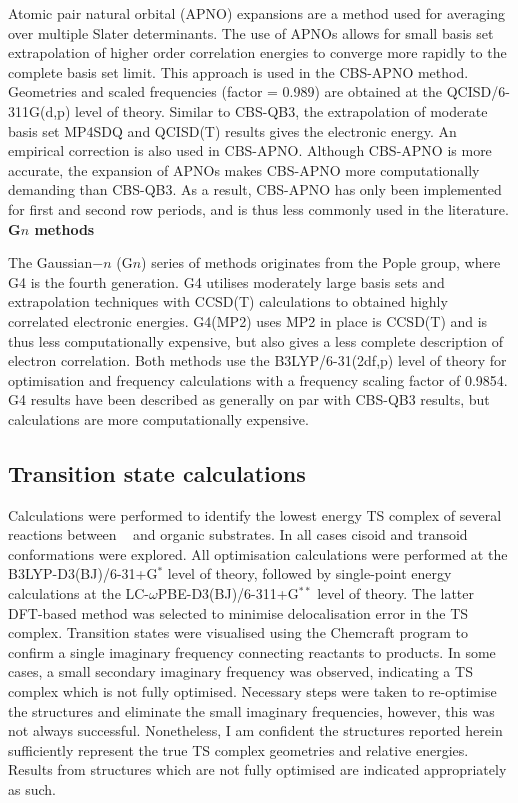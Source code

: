 Atomic pair natural orbital (APNO) expansions are a method used for averaging over multiple Slater determinants. The use of APNOs allows for small basis set extrapolation of higher order correlation energies to converge more rapidly to the complete basis set limit. This approach is used in the CBS-APNO method.\cite{Ochterski1996} Geometries and scaled frequencies (factor = 0.989) are obtained at the QCISD/6-311G(d,p) level of theory. Similar to CBS-QB3, the extrapolation of moderate basis set MP4SDQ and QCISD(T) results gives the electronic energy. An empirical correction is also used in CBS-APNO. Although CBS-APNO is more accurate, the expansion of APNOs makes CBS-APNO more computationally demanding than CBS-QB3. As a result, CBS-APNO has only been implemented for first and second row periods, and is thus less commonly used in the literature.
\\

\noindent \textbf{G$n$ methods}

The Gaussian$-n$ (G$n$) series of methods originates from the Pople group,\cite{Pople1989} where G4 is the fourth generation. G4 utilises moderately large basis sets and extrapolation techniques with CCSD(T) calculations to obtained highly correlated electronic energies. G4(MP2) uses MP2 in place is CCSD(T) and is thus less computationally expensive, but also gives a less complete description of electron correlation. Both methods use the B3LYP/6-31(2df,p) level of theory for optimisation and frequency calculations with a frequency scaling factor of 0.9854. G4 results have been described as generally on par with CBS-QB3 results,\cite{Somers2015, Simmie2015} but calculations are more computationally expensive.

\subsection{Transition state calculations}

Calculations were performed to identify the lowest energy TS complex of several reactions between \cumo~ and organic substrates. In all cases cisoid and transoid conformations were explored. All optimisation calculations were performed at the B3LYP-D3(BJ)/6-31+G$^*$ level of theory, followed by single-point energy calculations at the LC-$\omega$PBE-D3(BJ)/6-311+G$^{**}$ level of theory. The latter DFT-based method was selected to minimise delocalisation error in the TS complex.\cite{OterodelaRoza2014} Transition states were visualised using the Chemcraft program\cite{ccraft} to confirm a single imaginary frequency connecting reactants to products. In some cases, a small secondary imaginary frequency was observed, indicating a TS complex which is not fully optimised. Necessary steps were taken to re-optimise the structures and eliminate the small imaginary frequencies, however, this was not always successful. Nonetheless, I am confident the structures reported herein sufficiently represent the true TS complex geometries and relative energies. Results from structures which are not fully optimised are indicated appropriately as such.

